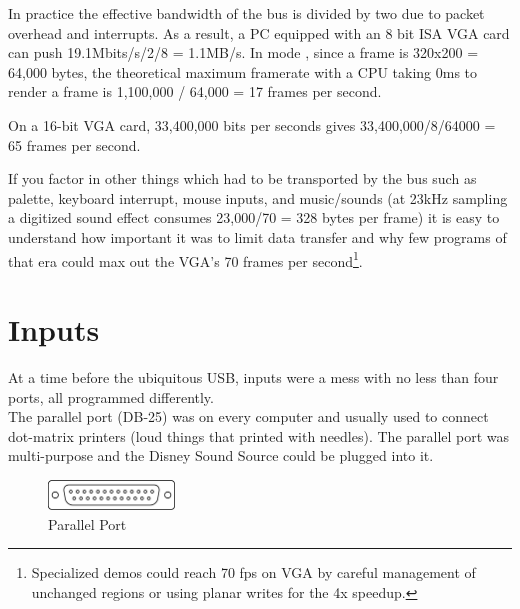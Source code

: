 \documentclass[book.tex]{subfiles}
\begin{document}
\par
 In practice the effective bandwidth of the bus is divided by two due to packet overhead and interrupts. As a result, a PC equipped with an 8 bit ISA VGA card can push 19.1Mbits/s/2/8 = 1.1MB/s. In mode , since a frame is 320x200 = 64,000 bytes, the theoretical maximum framerate with a CPU taking 0ms to render a frame is 1,100,000 / 64,000 = 17 frames per second.\\
 \par
 On a 16-bit VGA card, 33,400,000 bits per seconds gives 33,400,000/8/64000 = 65 frames per second.\\
 \par
 If you factor in other things which had to be transported by the bus such as palette, keyboard interrupt, mouse inputs, and music/sounds (at 23kHz sampling a digitized sound effect consumes 23,000/70 = 328 bytes per frame) it is easy to understand how important it was to limit data transfer and why few programs of that era could max out the VGA's 70 frames per second\footnote{Specialized demos could reach 70 fps on VGA by careful management of unchanged regions or using planar writes for the 4x speedup.}.














\section{Inputs}
At a time before the ubiquitous USB, inputs were a mess with no less than four ports, all programmed differently.\\

The parallel port (DB-25) was on every computer and usually used to connect dot-matrix printers (loud things that printed with needles). The parallel port was multi-purpose and the Disney Sound Source could be plugged into it.\\
\par
 \begin{figure}[H]
\centering
\includegraphics[width=0.3\textwidth]{imgs/drawings/ports/DB-25_parallel_port.eps}
\caption{Parallel Port}
\label{fig:parallelPort}
\end{figure}
\end{document}
